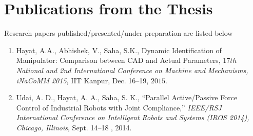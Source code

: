 \chapter*{Publications from the Thesis}
Research papers published/presented/under preparation are listed below
\begin{enumerate}

    \item Hayat, A.A., Abhishek, V., Saha, S.K., {Dynamic Identification of Manipulator: Comparison between CAD and Actual Parameters}, \emph{$17{th}$ National and 2nd International Conference on Machine and Mechanisms, iNaCoMM 2015}, IIT Kanpur, Dec. 16--19,  $\text{2015}$.
\vspace*{-0.1 in}
    \item {Udai, A. D., Hayat, A. A., Saha, S. K., ``Parallel Active/Passive Force Control of Industrial Robots with Joint Compliance,'' \emph{IEEE/RSJ International Conference on Intelligent Robots and Systems (IROS 2014), Chicago, Illinois}, Sept. 14--18 , 2014.}
   \end{enumerate}